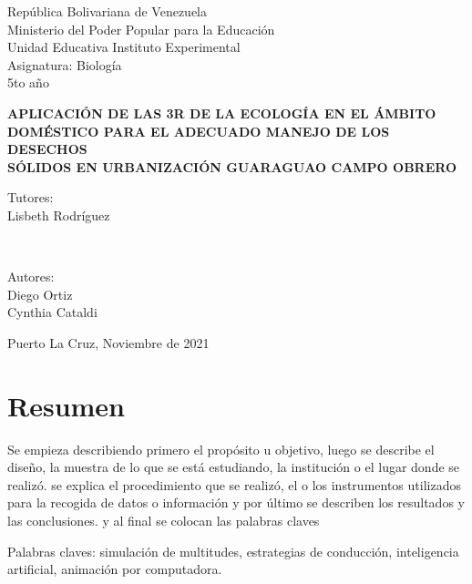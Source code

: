 \setcounter{page}{2}
\begin{center}
República Bolivariana de Venezuela\\[0.1cm] 
Ministerio del Poder Popular para la Educación\\[0.1cm]
Unidad Educativa Instituto Experimental\\[0.1cm] 
Asignatura: Biología\\[0.1cm] 
5to año\\[0.1cm] 
\end{center}

\vspace*{0.5cm}
\begin{center}
    \textbf{\large{APLICACIÓN DE LAS 3R DE LA ECOLOGÍA EN EL ÁMBITO\\[0.1cm]
    DOMÉSTICO PARA EL ADECUADO MANEJO DE LOS DESECHOS\\[0.2cm]
    SÓLIDOS EN URBANIZACIÓN GUARAGUAO CAMPO OBRERO}}\\[0.1cm]
\end{center}

\vspace*{0.5cm}
\begin{minipage}{0.4\textwidth}
\begin{flushleft}
\textup{Tutores:}\\
\textup{Lisbeth Rodríguez}
\end{flushleft}
\end{minipage}
~
\begin{minipage}{0.4\textwidth}
\begin{flushright}
\textup{Autores:} \\
Diego Ortiz\\
Cynthia Cataldi
\end{flushright}
\end{minipage}
\vspace*{0.5cm}
\begin{center}
Puerto La Cruz, Noviembre de 2021
\end{center}
\vspace*{1cm}

\chapter*{Resumen}


Se empieza describiendo primero el propósito u objetivo, luego se describe el diseño, la muestra de lo que se está estudiando, la institución o el lugar donde se realizó. se explica el procedimiento que se realizó, el o los instrumentos utilizados para la recogida de datos o información y por último se describen los resultados y las conclusiones. y al final se colocan las palabras claves

Palabras claves: simulación de multitudes, estrategias de conducción, inteligencia artificial, animación por computadora.

\newpage